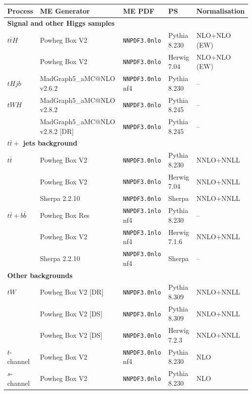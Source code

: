 \begin{table}[h!]
\hspace*{-1.5cm}
\footnotesize
\renewcommand{\arraystretch}{1.1}
\begin{tabular}{|lllll|}
\hline\hline
Process & ME Generator & ME PDF & PS & Normalisation \\
\hline
\multicolumn{5}{|l|}{\textbf{Signal and other Higgs samples}} \\
\hline
$t\bar{t}H$   & Powheg Box V2 & \verb|NNPDF3.0nlo| & Pythia 8.230 & NLO+NLO (EW) \\
              & Powheg Box V2 & \verb|NNPDF3.0nlo| & Herwig 7.04  & NLO+NLO (EW) \\
$tHjb$        & MadGraph5\_aMC@NLO v2.6.2 & \verb|NNPDF3.0nlo| nf4 & Pythia 8.230 & -- \\
$tWH$         & MadGraph5\_aMC@NLO v2.8.2 & \verb|NNPDF3.0nlo| & Pythia 8.245 & -- \\
              & MadGraph5\_aMC@NLO v2.8.2 [DR] & \verb|NNPDF3.0nlo| & Pythia 8.245 & -- \\
\hline
\multicolumn{5}{|l|}{\textbf{$t\bar{t} +$ jets background}} \\
\hline
$t\bar{t}$    & Powheg Box V2 & \verb|NNPDF3.0nlo| & Pythia 8.230 & NNLO+NNLL \\
              & Powheg Box V2 & \verb|NNPDF3.0nlo| & Herwig 7.04  & NNLO+NNLL \\
              & Sherpa 2.2.10 & \verb|NNPDF3.0nlo| & Sherpa       & NNLO+NNLL \\
$t\bar{t}+b\bar{b}$ & Powheg Box Res & \verb|NNPDF3.1nlo| nf4 & Pythia 8.230 & -- \\
              & Powheg Box V2 & \verb|NNPDF3.1nlo| nf4 & Herwig 7.1.6 & NNLO+NNLL \\
              & Sherpa 2.2.10 & \verb|NNPDF3.0nlo| nf4 & Sherpa       & -- \\
\hline
\multicolumn{5}{|l|}{\textbf{Other backgrounds}} \\
\hline
$tW$          & Powheg Box V2 [DR] & \verb|NNPDF3.0nlo| & Pythia 8.309 & NNLO+NNLL \\
              & Powheg Box V2 [DS] & \verb|NNPDF3.0nlo| & Pythia 8.309 & NNLO+NNLL \\
              & Powheg Box V2 [DS] & \verb|NNPDF3.0nlo| & Herwig 7.2.3 & NNLO+NNLL \\
$t$-channel   & Powheg Box V2 & \verb|NNPDF3.0nlo| nf4 & Pythia 8.230 & NLO \\
$s$-channel   & Powheg Box V2 & \verb|NNPDF3.0nlo| & Pythia 8.230 & NLO \\

\end{tabular}
\end{table}
